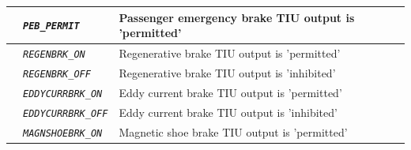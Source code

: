 \documentclass{template/openetcs}
\begin{document}
\begin{itemize}
\begin{longtable}{|l|l|l|}
			\hline

			&	\begin{minipage}[t]{0.40\linewidth} \emph{\texttt{PEB\_PERMIT}} \end{minipage}
			&	\begin{minipage}[t]{0.38\linewidth} Passenger emergency brake TIU output is ’permitted’ \end{minipage} \\ 

			\hline

			&	\begin{minipage}[t]{0.40\linewidth} \emph{\texttt{REGENBRK\_ON}} \end{minipage}
			&	\begin{minipage}[t]{0.38\linewidth} Regenerative brake TIU output is ’permitted’ \end{minipage} \\ 

			\hline

			&	\begin{minipage}[t]{0.40\linewidth} \emph{\texttt{REGENBRK\_OFF}} \end{minipage}
			&	\begin{minipage}[t]{0.38\linewidth} Regenerative brake TIU output is ’inhibited’ \end{minipage} \\ 

			\hline

			&	\begin{minipage}[t]{0.40\linewidth} \emph{\texttt{EDDYCURRBRK\_ON}} \end{minipage}
			&	\begin{minipage}[t]{0.38\linewidth} Eddy current brake TIU output is ’permitted’ \end{minipage} \\ 

			\hline

			&	\begin{minipage}[t]{0.40\linewidth} \emph{\texttt{EDDYCURRBRK\_OFF}} \end{minipage}
			&	\begin{minipage}[t]{0.38\linewidth} Eddy current brake TIU output is ’inhibited’ \end{minipage} \\ 

			\hline

			&	\begin{minipage}[t]{0.40\linewidth} \emph{\texttt{MAGNSHOEBRK\_ON}} \end{minipage}
			&	\begin{minipage}[t]{0.38\linewidth} Magnetic shoe brake TIU output is ’permitted’ \end{minipage} \\ 


\end{longtable}
\end{itemize}
\end{document}
